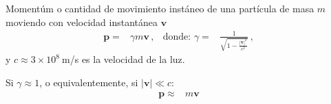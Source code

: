 Momentúm o cantidad de movimiento instáneo de una partícula de masa $m$ moviendo con velocidad instantánea $\mathbf{v}$
\begin{align}
  \mathbf{p}=&\gamma m \mathbf{v}\,, &\text{donde: } \gamma=&\frac{1}{\sqrt{1-\frac{|\mathbf{v}|^2}{c^2}}}\,,
\end{align}
y $c\approx 3\times 10^8\ $m/s es la velocidad de la luz.

Si $\gamma\approx1$, o equivalentemente, si $|\mathbf{v}|\ll c$:
\begin{align}
  \mathbf{p}\approx &m \mathbf{v}
\end{align}



